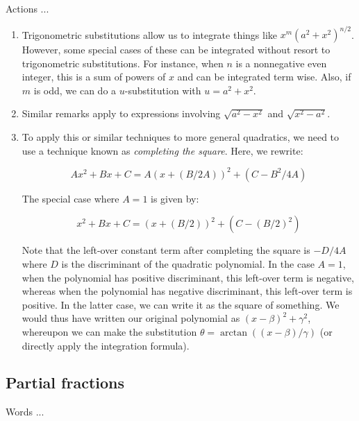 \documentclass[10pt]{amsart}
\begin{document}
Actions ...

\begin{enumerate}
\item Trigonometric substitutions allow us to integrate things like
  $x^m(a^2 + x^2)^{n/2}$. However, some special cases of these can be
  integrated without resort to trigonometric substitutions. For
  instance, when $n$ is a nonnegative even integer, this is a sum of
  powers of $x$ and can be integrated term wise. Also, if $m$ is odd,
  we can do a $u$-substitution with $u = a^2 + x^2$.
\item Similar remarks apply to expressions involving $\sqrt{a^2 -
  x^2}$ and $\sqrt{x^2 - a^2}$.
\item To apply this or similar techniques to more general quadratics,
  we need to use a technique known as {\em completing the
  square}. Here, we rewrite:

  $$Ax^2 + Bx + C = A(x + (B/2A))^2 + (C - B^2/4A)$$

  The special case where $A = 1$ is given by:

  $$x^2 + Bx + C = (x + (B/2))^2 + (C - (B/2)^2)$$

  Note that the left-over constant term after completing the square is
  $-D/4A$ where $D$ is the discriminant of the quadratic
  polynomial. In the case $A = 1$, when the polynomial has positive
  discriminant, this left-over term is negative, whereas when the
  polynomial has negative discriminant, this left-over term is
  positive. In the latter case, we can write it as the square of
  something. We would thus have written our original polynomial as $(x
  - \beta)^2 + \gamma^2$, whereupon we can make the substitution
  $\theta = \arctan((x - \beta)/\gamma)$ (or directly apply the
  integration formula).
\end{enumerate}

\subsection{Partial fractions}

Words ...
\end{document}
